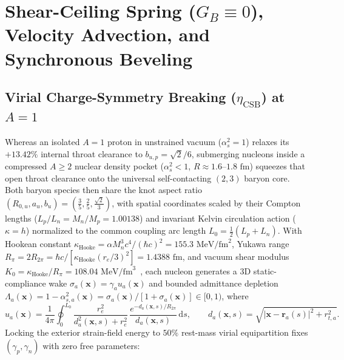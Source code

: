 \documentclass[11pt, a4paper]{article}
\DeclareRobustCommand{\dd}{\mathrm{d}}
\begin{document}
\section{\texorpdfstring{Shear-Ceiling Spring ($G_B \equiv 0$), Velocity Advection, and Synchronous Beveling}{Shear-Ceiling Spring (GB = 0), Velocity Advection, and Synchronous Beveling}}
\label{sec:spring_velocity_cone}

\subsection{\texorpdfstring{Virial Charge-Symmetry Breaking ($\eta_{\mathrm{CSB}}$) at $A = 1$}{Virial Charge-Symmetry Breaking at A = 1}}
Whereas an isolated $A = 1$ proton in unstrained vacuum ($\alpha_s^2 = 1$) relaxes its $+13.42\%$ internal throat clearance to $b_{u,p} = \sqrt{2}/6$, submerging nucleons inside a compressed $A \ge 2$ nuclear density pocket ($\alpha_s^2 < 1$, $R \approx 1.6\text{--}1.8\text{ fm}$) squeezes that open throat clearance onto the universal self-contacting $(2,3)$ baryon core. Both baryon species then share the knot aspect ratio $(R_{0,u}, a_u, b_u) = (\frac{3}{5}, \frac{2}{5}, \frac{\sqrt{2}}{3})$, with spatial coordinates scaled by their Compton lengths ($L_p/L_n = M_n/M_p = 1.00138$) and invariant Kelvin circulation action ($\kappa = h$) normalized to the common coupling arc length $L_0 = \frac{1}{2}(L_p + L_n)$. With Hookean constant $\kappa_{\mathrm{Hooke}} = \alpha M_n^3 c^4/(\hbar c)^2 = 155.3\text{ MeV/fm}^2$, Yukawa range $R_\pi = 2R_{2\pi} = \hbar c/[\kappa_{\mathrm{Hooke}}(r_e/3)^2] = 1.4388\text{ fm}$, and vacuum shear modulus $K_0 = \kappa_{\mathrm{Hooke}}/R_\pi = 108.04\text{ MeV/fm}^3$~\cite{bairmosheh2026}, each nucleon generates a 3D static-compliance wake $\sigma_a(\mathbf{x}) = \gamma_a u_a(\mathbf{x})$ and bounded admittance depletion $\Lambda_a(\mathbf{x}) = 1 - \alpha_{s,a}^2(\mathbf{x}) = \sigma_a(\mathbf{x})/[1 + \sigma_a(\mathbf{x})] \in [0, 1)$, where
\begin{equation}
    u_a(\mathbf{x}) = \frac{1}{4\pi}\oint_0^{L_0} \frac{r_e^2}{d_a^2(\mathbf{x}, s) + r_e^2}\,\frac{e^{-d_a(\mathbf{x}, s)/R_{2\pi}}}{d_a(\mathbf{x}, s)}\,\dd s, \qquad
    d_a(\mathbf{x}, s) = \sqrt{|\mathbf{x} - \mathbf{r}_a(s)|^2 + r_{t,a}^2}.
    \label{eq:single_nucleon_wake}
\end{equation}
Locking the exterior strain-field energy to $50\%$ rest-mass virial equipartition fixes $(\gamma_p, \gamma_n)$ with zero free parameters:
\end{document}
